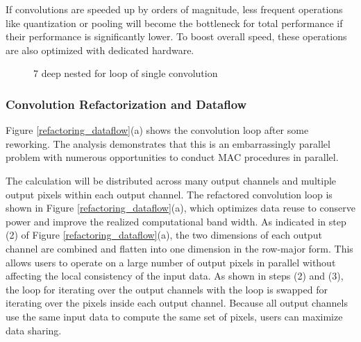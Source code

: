 \documentclass[letterpaper, 10 pt, conference]{ieeeconf}  %
\begin{document}
If convolutions are speeded up by orders of magnitude, less frequent operations like quantization or pooling will become the bottleneck for total performance if their performance is significantly lower. To boost overall speed, these operations are also optimized with dedicated hardware\cite{fsd_computer}.


   \begin{figure}[thpb]
      \centering
      \caption{7 deep nested for loop of single convolution}
      \label{seven_deep_nested}
   \end{figure}
   
\subsubsection{Convolution Refactorization and Dataflow}
   

Figure \ref{refactoring_dataflow}(a) shows the convolution loop after some reworking. The analysis demonstrates that this is an embarrassingly parallel problem with numerous opportunities to conduct MAC procedures in parallel.

The calculation will be distributed across many output channels and multiple output pixels within each output channel. The refactored convolution loop is shown in Figure \ref{refactoring_dataflow}(a), which optimizes data reuse to conserve power and improve the realized computational band width. As indicated in step (2) of Figure \ref{refactoring_dataflow}(a), the two dimensions of each output channel are combined and flatten into one dimension in the row-major form. This allows users to operate on a large number of output pixels in parallel without affecting the local consistency of the input data. As shown in steps (2) and (3), the loop for iterating over the output channels with the loop is swapped for iterating over the pixels inside each output channel. Because all output channels use the same input data to compute the same set of pixels, users can maximize data sharing\cite{fsd_computer}.
\end{document}
